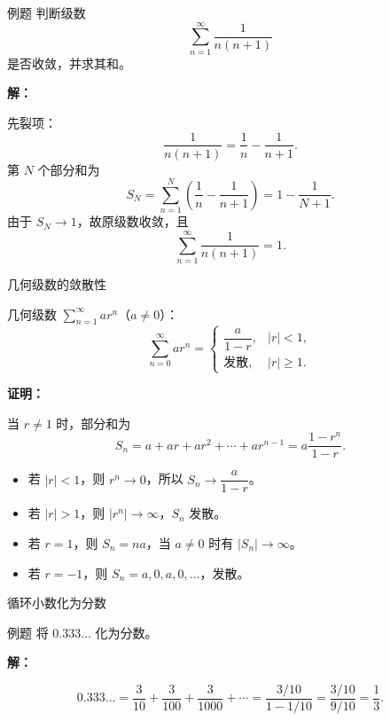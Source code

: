 \documentclass[aspectratio=169,10pt]{ctexbeamer}
\begin{document}
\begin{frame}
	
	\begin{block}{例题}
		判断级数
		\[
		\sum_{n=1}^{\infty}\frac{1}{n(n+1)}
		\]
		是否收敛，并求其和。
	\end{block}
	\pause
	\textbf{解：}
	
	先裂项：
	\[
	\frac{1}{n(n+1)}=\frac1n-\frac{1}{n+1}.
	\]
	第 $N$ 个部分和为
	\[
	S_N=\sum_{n=1}^{N}\left(\frac1n-\frac{1}{n+1}\right)
	=1-\frac{1}{N+1}.
	\]
	由于 $S_N\to1$，故原级数收敛，且
	\[
	\sum_{n=1}^{\infty}\frac{1}{n(n+1)}=1.
	\]
	
	
\end{frame}

\begin{frame}{几何级数的敛散性}
	\small
	\begin{block}{}
		几何级数 \(\sum\limits_{n = 1}^{  \infty } ar^n\)（\(a \neq 0\)）：
		\[
		\sum_{n=0}^{\infty} ar^n = 
		\begin{cases}
			\dfrac{a}{1-r}, & |r| < 1,\\[6pt]
			\text{发散}, & |r| \geq 1.
		\end{cases}
		\]
	\end{block}
	\pause
	\textbf{证明：}
	
	当 \(r \neq 1\) 时，部分和为
	\[
	S_n = a + ar + ar^2 + \cdots + ar^{n-1} = a\dfrac{1-r^n}{1-r}.
	\]
	\begin{itemize}
		\item 若 \(|r| < 1\)，则 \(r^n \to 0\)，所以 \(S_n \to \dfrac{a}{1-r}\)。
		\item 若 \(|r| > 1\)，则 \(|r^n| \to \infty\)，\(S_n\) 发散。
		\item 若 \(r=1\)，则 \(S_n=na\)，当 \(a\neq0\) 时有 \(|S_n|\to\infty\)。
		\item 若 \(r = -1\)，则 \(S_n = a, 0, a, 0, \dots\)，发散。
	\end{itemize}
	
\end{frame}

\begin{frame}{循环小数化为分数}
	\begin{block}{例题}
		将 \(0.333\ldots\) 化为分数。
	\end{block}
	\pause
	\vspace{0.7cm}
	\textbf{解：}
	
	\[
	0.333\ldots = \dfrac{3}{10} + \dfrac{3}{100} + \dfrac{3}{1000} + \cdots = \dfrac{3/10}{1-1/10} = \dfrac{3/10}{9/10} = \dfrac{1}{3}.
	\]
\end{frame}
\end{document}
